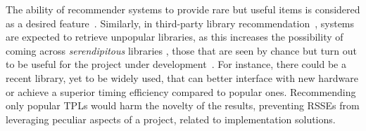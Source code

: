 The ability of recommender systems to provide rare but useful items %
is considered as a desired feature~\cite{10.1145/1454008.1454012}. Similarly, in third-party library recommendation~\cite{NGUYEN2019110460,6671293}, systems are expected to %
retrieve unpopular libraries, as %
this increases the possibility of coming across \emph{serendipitous} libraries \cite{Ge:2010_catalog_coverage}, \eg those that are seen by chance but turn out to be useful for the project under development~\cite{DBLP:journals/ese/RoccoRSNR21}. For instance, there could be a recent library, yet to be widely used, that can better interface with new hardware or achieve a superior timing efficiency %
compared to popular ones. Recommending only popular TPLs would harm the novelty of the results, preventing %
RSSEs from leveraging peculiar aspects of a project, \eg related to implementation solutions. %











